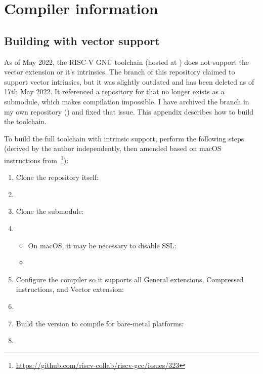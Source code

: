 \chapter{Compiler information}

\section{Building  with vector support}\label{appx:building_rvv_gcc_toolchain}

As of May 2022, the RISC-V GNU toolchain (hosted at ) does not support the vector extension or it's intrinsics.
The  branch of this repository claimed to support vector intrinsics, but it was slightly outdated and has been deleted as of 17th May 2022.
It referenced a repository for  that no longer exists as a submodule, which makes compilation impossible.
I have archived the branch in my own repository () and fixed that issue.
This appendix describes how to build the toolchain.

To build the full toolchain with intrinsic support, perform the following steps (derived by the author independently, then amended based on macOS instructions from~\footnote{\url{https://github.com/riscv-collab/riscv-gcc/issues/323}}):
\begin{enumerate}
    \item Clone the repository itself:
    \item[\code{\$}] 
    \item Clone the  submodule:
    \item[\code{\$}] 
    \begin{itemize}
        \item On macOS, it may be necessary to disable SSL:
        \item[\code{\$}] 
    \end{itemize}
    \item Configure the compiler so it supports all General extensions, Compressed instructions, and Vector extension:
    \item[\code{\$}] 
    \item Build the  version to compile for bare-metal platforms:
    \item[\code{\$}] 
\end{enumerate}

